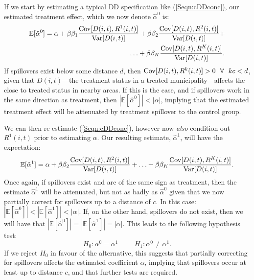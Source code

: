 If we start by estimating a typical DD specification like (\ref{Seqn:cDDconc}),
our estimated treatment effect, which we now denote $\hat\alpha^0$ is:
\begin{equation}
\nonumber
\begin{split}
\mathbb{E}[\hat\alpha^0]=\alpha + \beta\beta_1\frac{\mathrm{Cov}[D(i,t),R^1(i,t)]}{\mathrm{Var}[D(i,t)]}
                                + \beta\beta_2\frac{\mathrm{Cov}[D(i,t),R^2(i,t)]}{\mathrm{Var}[D(i,t)]}
                                + \\ \ldots
                                + \beta\beta_K\frac{\mathrm{Cov}[D(i,t),R^K(i,t)]}{\mathrm{Var}[D(i,t)]}.
\end{split}
\end{equation}
If spillovers exist below some distance $d$, then 
$\Cov[D(i,t),R^k(i,t)]>0 \ \ \forall \ \ kc<d$, given that $D(i,t)$---the treatment
status in a treated municipality---affects the close to treated status in nearby 
areas. If this is the case, and if 
spillovers work in the same direction as treatment, then $|\mathbb{E}[\hat\alpha^0]|
<|\alpha|$, implying that the estimated treatment effect will be attenuated by 
treatment spillover to the control group.  

We can then re-estimate (\ref{Seqn:cDDconc}), however now \emph{also} condition
out $R^1(i,t)$ prior to estimating $\alpha$.  Our resulting estimate, $\hat\alpha^1$,
will have the expectation:
\begin{equation}
\nonumber
\begin{split}
\mathbb{E}[\hat\alpha^1]=\alpha + \beta\beta_2\frac{\mathrm{Cov}[D(i,t),R^2(i,t)]}{\mathrm{Var}[D(i,t)]}
                                + \ldots
                                + \beta\beta_K\frac{\mathrm{Cov}[D(i,t),R^K(i,t)]}{\mathrm{Var}[D(i,t)]}.
\end{split}
\end{equation}
Once again, if spillovers exist and are of the same sign as treatment, then the
estimate $\hat\alpha^1$ will be attenuated, but not as badly as $\hat\alpha^0$ given
that we now partially correct for spillovers up to a distance of $c$.  In this case:
$|\mathbb{E}[\hat\alpha^0]|<|\mathbb{E}[\hat\alpha^1]|<|\alpha|$.  If, on the other
hand, spillovers do not exist, then we will have that $|\mathbb{E}[\hat\alpha^0]|=
|\mathbb{E}[\hat\alpha^1]|=|\alpha|$.  This leads to the following hypothesis test:
\[
H_0: \alpha^0=\alpha^1 \hspace{1cm}
H_1: \alpha^0\neq\alpha^1.
\]
If we reject $H_0$ in favour of the alternative, this suggests that partially 
correcting for spillovers affects the estimated coefficient $\alpha$, implying that
spillovers occur at least up to distance $c$, and that further tests are required.  

